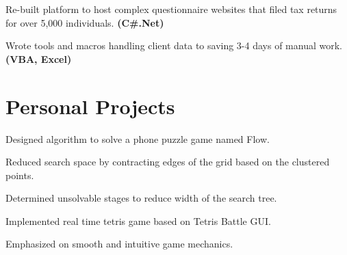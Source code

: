 \documentclass[letterpaper]{kevin-resume} %
\begin{document}
\begin{minipage}[t]{0.63\textwidth}
\sectionspace %


\begin{tightitemize}
	\item Re-built platform to host complex questionnaire websites that filed tax returns for over 5,000 individuals. \textbf{(C\#.Net)}
	\item Wrote tools and macros handling client data to saving 3-4 days of manual work. \textbf{(VBA, Excel)}
\end{tightitemize}

\sectionspace %


\sectionspace %

\section{Personal Projects}

\begin{tightitemize}
	\item Designed algorithm to solve a phone puzzle game named Flow.
 	\item Reduced search space by contracting edges of the grid based on the clustered points.
 	\item Determined unsolvable stages to reduce width of the search tree.
\end{tightitemize}

\sectionspace %


\begin{tightitemize}
	\item Implemented real time tetris game based on Tetris Battle GUI.
	\item Emphasized on smooth and intuitive game mechanics.
\end{tightitemize}

\sectionspace %


\end{minipage} %
\end{document}
